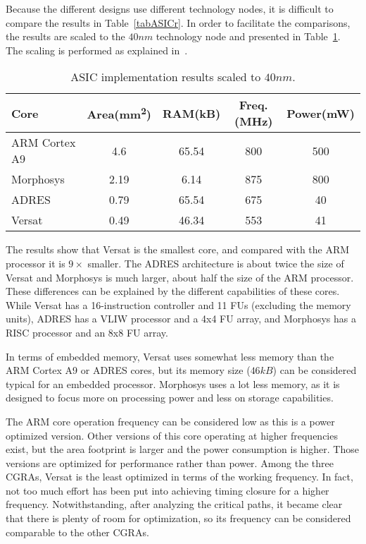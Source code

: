 Because the different designs use different technology nodes, it is
difficult to compare the results in Table~\ref{tabASICr}. In order to
facilitate the comparisons, the results are scaled to the $40nm$
technology node and presented in Table~\ref{tabASICrs}. The scaling is
performed as explained in~\cite{borkar99}.

\begin{table}[!htb]
  \renewcommand{\arraystretch}{1.2} %
  \caption{ASIC implementation results scaled to $40nm$.}
  \label{tabASICrs}
  \centering
  \begin{tabular}{lcccc}
    \toprule
    Core & Area(mm\textsuperscript{2}) & RAM(kB) &  Freq.(MHz) & Power(mW)\\
    \midrule
    ARM Cortex A9~\cite{wang} &  4.6 & 65.54 & 800 & 500 \\
    Morphosys~\cite{Lee00}    & 2.19 &  6.14 & 875 & 800 \\
    ADRES~\cite{Mei05}        & 0.79 & 65.54 & 675 &  40 \\
    Versat                    & 0.49 & 46.34 & 553 &  41 \\
    \bottomrule
  \end{tabular}
\end{table}

The results show that Versat is the smallest core, and compared with
the ARM processor it is $9\times$ smaller. The ADRES architecture is
about twice the size of Versat and Morphosys is much larger, about
half the size of the ARM processor. These differences can be explained
by the different capabilities of these cores. While Versat has a
16-instruction controller and 11 FUs (excluding the memory units),
ADRES has a VLIW processor and a 4x4 FU array, and Morphosys has a
RISC processor and an 8x8 FU array.

In terms of embedded memory, Versat uses somewhat less memory than the
ARM Cortex A9 or ADRES cores, but its memory size ($46kB$) can be
considered typical for an embedded processor. Morphosys uses a lot
less memory, as it is designed to focus more on processing power and
less on storage capabilities.

The ARM core operation frequency can be considered low as this is a
power optimized version. Other versions of this core operating at
higher frequencies exist, but the area footprint is larger and the
power consumption is higher. Those versions are optimized for
performance rather than power. Among the three CGRAs, Versat is the
least optimized in terms of the working frequency. In fact, not too
much effort has been put into achieving timing closure for a higher
frequency. Notwithstanding, after analyzing the critical paths, it
became clear that there is plenty of room for optimization, so its
frequency can be considered comparable to the other CGRAs.

